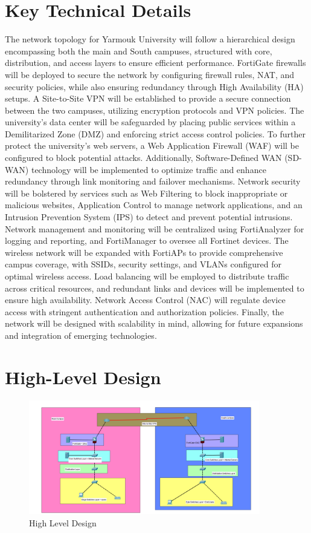 \documentclass[12pt]{report}
\begin{document}
\section{Key Technical Details}
The network topology for Yarmouk University will follow a hierarchical design encompassing both the main and South campuses, structured with core, distribution, and access layers to ensure efficient performance. FortiGate firewalls will be deployed to secure the network by configuring firewall rules, NAT, and security policies, while also ensuring redundancy through High Availability (HA) setups. A Site-to-Site VPN will be established to provide a secure connection between the two campuses, utilizing encryption protocols and VPN policies. The university's data center will be safeguarded by placing public services within a Demilitarized Zone (DMZ) and enforcing strict access control policies. To further protect the university’s web servers, a Web Application Firewall (WAF) will be configured to block potential attacks. Additionally, Software-Defined WAN (SD-WAN) technology will be implemented to optimize traffic and enhance redundancy through link monitoring and failover mechanisms. Network security will be bolstered by services such as Web Filtering to block inappropriate or malicious websites, Application Control to manage network applications, and an Intrusion Prevention System (IPS) to detect and prevent potential intrusions. Network management and monitoring will be centralized using FortiAnalyzer for logging and reporting, and FortiManager to oversee all Fortinet devices. The wireless network will be expanded with FortiAPs to provide comprehensive campus coverage, with SSIDs, security settings, and VLANs configured for optimal wireless access. Load balancing will be employed to distribute traffic across critical resources, and redundant links and devices will be implemented to ensure high availability. Network Access Control (NAC) will regulate device access with stringent authentication and authorization policies. Finally, the network will be designed with scalability in mind, allowing for future expansions and integration of emerging technologies.




\newpage
\section{High-Level Design}
\begin{figure}[h]
    \centering
    \includegraphics[width=0.9\textwidth]{images/HLfig.png}
    \caption{High Level Design}
    \label{fig:High Level Design}
\end{figure}
\end{document}

